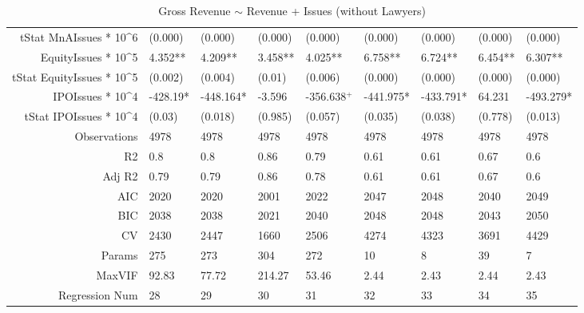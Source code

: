 \begin{table}[ht]
\begin{tabular}{rllllllll}
  tStat MnAIssues * 10^6 & (0.000) & (0.000) & (0.000) & (0.000) & (0.000) & (0.000) & (0.000) & (0.000) \\ 
  EquityIssues * 10^5 & 4.352** & 4.209** & 3.458** & 4.025** & 6.758** & 6.724** & 6.454** & 6.307** \\ 
  tStat EquityIssues * 10^5 & (0.002) & (0.004) & (0.01) & (0.006) & (0.000) & (0.000) & (0.000) & (0.000) \\ 
  IPOIssues * 10^4 & -428.19* & -448.164* & -3.596 & -356.638$^{+}$ & -441.975* & -433.791* & 64.231 & -493.279* \\ 
  tStat IPOIssues * 10^4 & (0.03) & (0.018) & (0.985) & (0.057) & (0.035) & (0.038) & (0.778) & (0.013) \\ 
  Observations & 4978 & 4978 & 4978 & 4978 & 4978 & 4978 & 4978 & 4978 \\ 
  R2 & 0.8 & 0.8 & 0.86 & 0.79 & 0.61 & 0.61 & 0.67 & 0.6 \\ 
  Adj R2 & 0.79 & 0.79 & 0.86 & 0.78 & 0.61 & 0.61 & 0.67 & 0.6 \\ 
  AIC & 2020 & 2020 & 2001 & 2022 & 2047 & 2048 & 2040 & 2049 \\ 
  BIC & 2038 & 2038 & 2021 & 2040 & 2048 & 2048 & 2043 & 2050 \\ 
  CV & 2430 & 2447 & 1660 & 2506 & 4274 & 4323 & 3691 & 4429 \\ 
  Params & 275 & 273 & 304 & 272 & 10 & 8 & 39 & 7 \\ 
  MaxVIF & 92.83 & 77.72 & 214.27 & 53.46 & 2.44 & 2.43 & 2.44 & 2.43 \\ 
  Regression Num & 28 & 29 & 30 & 31 & 32 & 33 & 34 & 35 \\ 
   \hline
\end{tabular}
\caption{Gross Revenue $\sim$ Revenue + Issues (without Lawyers)} 
\end{table}
